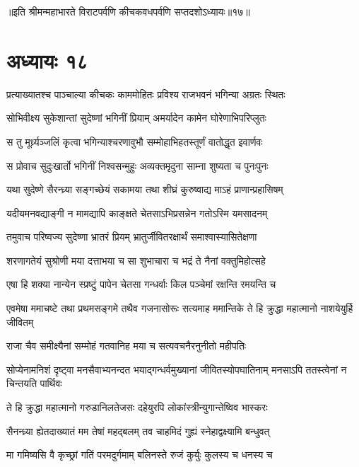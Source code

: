 ॥इति श्रीमन्महाभारते विराटपर्वणि कीचकवधपर्वणि सप्तदशोऽध्यायः॥१७॥

\chapter{अध्यायः १८}

\twolineshloka
{प्रत्याख्यातश्च पाञ्चाल्या कीचकः काममोहितः}
{प्रविश्य राजभवनं भगिन्या अग्रतः स्थितः}


\twolineshloka
{सोभिवीक्ष्य सुकेशान्तां सुदेष्णां भगिनीं प्रियाम्}
{अमर्यादेन कामेन घोरेणाभिपरिप्लुतः}


\twolineshloka
{स तु मूर्ध्र्यञ्जलिं कृत्वा भगिन्याश्चरणावुभौ}
{सम्मोहाभिहतस्तूर्णं वातोद्धृत इवार्णवः}


\twolineshloka
{स प्रोवाच सुदुःखार्तो भगिनीं निश्वसन्मुहुः}
{अव्यक्तमृदुना साम्ना शुष्यता च पुनःपुनः}


\twolineshloka
{यथा सुदेष्णे सैरन्ध्र्या सङ्गच्छेयं सकामया}
{तथा शीघ्रं कुरुष्वाद्य माऽहं प्राणान्प्रहासिषम्}


\twolineshloka
{यदीयमनवद्याङ्गी न मामद्यापि काङ्क्षते}
{चेतसाऽभिप्रसन्नेन गतोऽस्मि यमसादनम्}



\twolineshloka
{तमुवाच परिष्वज्य सुदेष्णा भ्रातरं प्रियम्}
{भ्रातुर्जीवितरक्षार्थं समाश्वास्यासितेक्षणा}


\twolineshloka
{शरणागतेयं सुश्रोणी मया दत्ताभया च सा}
{शुभाचारा च भद्रं ते नैनां वक्तुमिहोत्सहे}


\twolineshloka
{एषा हि शक्या नान्येन स्प्रष्टुं पापेन चेतसा}
{गन्धर्वाः किल पञ्चेमां रक्षन्ति रमयन्ति च}


\threelineshloka
{एवमेषा ममाचष्टे तथा प्रथमसङ्गमे}
{तथैव गजनासोरूः सत्यमाह ममान्तिके}
{ते हि क्रुद्धा महात्मानो नाशयेयुर्हि जीवितम्}


\twolineshloka
{राजा चैव समीक्ष्यैनां सम्मोहं गतवानिह}
{मया च सत्यवचनैरनुनीतो महीपतिः}


\threelineshloka
{सोप्येनामनिशं दृष्ट्वा मनसैवाभ्यनन्दत}
{भयाद्गन्धर्वमुख्यानां जीवितस्योपघातिनाम्}
{मनसाऽपि ततस्त्वेनां न चिन्तयति पार्थिवः}


\twolineshloka
{ते हि क्रुद्धा महात्मानो गरुडानिलतेजसः}
{दहेयुरपि लोकांस्त्रीन्युगान्तेष्विव भास्करः}


\twolineshloka
{सैनन्ध्र्या ह्येतदाख्यातं मम तेषां महद्बलम्}
{तव चाहमिदं गुह्यं स्नेहाद्वक्ष्यामि बन्धुवत्}


\twolineshloka
{मा गमिष्यसि वै कृच्छ्रां गतिं परमदुर्गमाम्}
{बलिनस्ते रुजं कुर्युः कुलस्य च धनस्य च}


